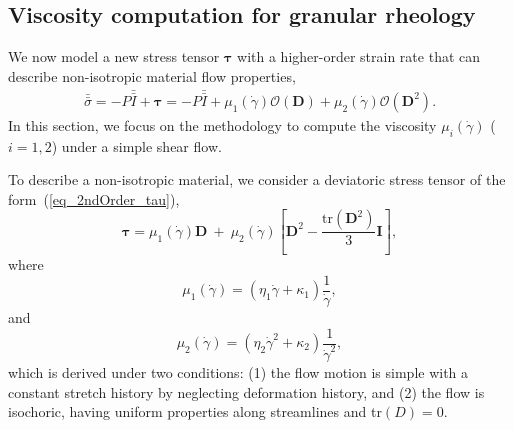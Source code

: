 \subsection{Viscosity computation for granular rheology}
We now model a new stress tensor $\bm \tau$ with a higher-order strain rate that can describe non-isotropic material flow properties,
\begin{align}
  \bar{\bar{\sigma}}
    = -P \bar{\bar{I}}  + \bm{\tau}
    =  -P \bar{\bar{I}}  
    + \mu_1(\dot{\gamma}) \mathcal{O}({\bm D})
    + \mu_2(\dot{\gamma}) \mathcal{O}({\bm D^2}).
  \end{align}
In this section, we focus on the methodology to compute the viscosity $\mu_i ({\dot{\gamma}})$ ($i = 1,2$) under a simple shear flow. 

To describe a non-isotropic material, we consider a deviatoric stress tensor of the form~(\ref{eq_2ndOrder_tau}), 
\begin{equation}
  {\bm {\bm \tau}}
  = \mu_1(\dot{\gamma}) {\bm D}
  \ +  \ 
 \mu_2 (\dot{\gamma})
  \left[ {\bm D}^2  - \frac{\text{tr}\left({\bm D}^2\right)}{3}{\bm I} \right],
\label{eq_2ndOrder_tau}
\end{equation}
where 
\begin{equation}
  \mu_1 (\dot{\gamma})
   = \left( \eta_1 \dot{\gamma}+ \kappa_1 \right) \frac{1}{\dot{\gamma}},
\label{eq_mu1_main}
\end{equation}
and 
\begin{equation}
  \mu_2 (\dot{\gamma}) = 
  \left( \eta_2  \dot{\gamma}^2
  +  \kappa_2 
  \right) \frac{1}{\dot{\gamma}^2},
  \label{eq_mu2_main}
\end{equation}
which is derived under two conditions:
(1) the flow motion is simple with a constant stretch history by neglecting deformation history, and (2) the flow is isochoric, having uniform properties along streamlines and tr$(D) = 0$. 


